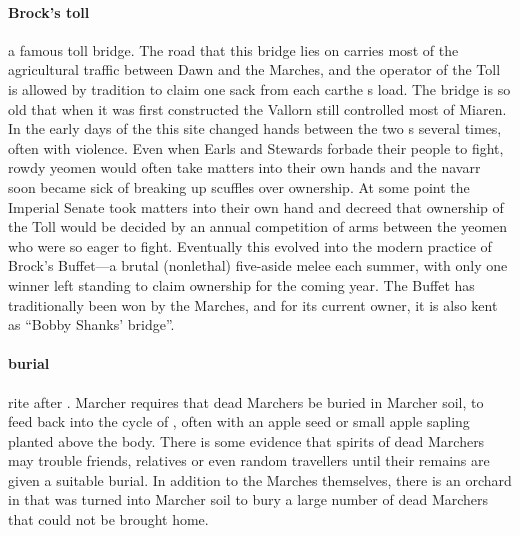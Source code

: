 \paragraph{Brock's toll} a famous toll bridge. The road that this bridge lies on carries most of the agricultural traffic between Dawn and the Marches, and the operator of the Toll is allowed by tradition to claim one sack from each carthe s load. The bridge is so old that when it was first constructed the Vallorn still controlled most of Miaren. \localpar In the early days of the  this site changed hands between the two s several times, often with violence. Even when Earls and Stewards forbade their people to fight, rowdy yeomen would often take matters into their own hands and the navarr soon became sick of breaking up scuffles over ownership. At some point the Imperial Senate took matters into their own hand and decreed that ownership of the Toll would be decided by an annual competition of arms between the yeomen who were so eager to fight. Eventually this evolved into the modern practice of Brock's Buffet—a brutal (nonlethal) five-aside melee each summer, with only one winner left standing to claim ownership for the coming year. The Buffet has traditionally been won by the Marches, and for its current owner, it is also kent as “Bobby Shanks' bridge”.
\paragraph{burial} rite after . Marcher  requires that dead Marchers be buried in Marcher soil, to feed back into the cycle of , often with an apple seed or small apple sapling planted above the body. There is some evidence that spirits of dead Marchers may trouble friends, relatives or even random travellers until their remains are given a suitable burial. In addition to the Marches themselves, there is an orchard in  that was turned into Marcher soil to bury a large number of dead Marchers that could not be brought home. 

